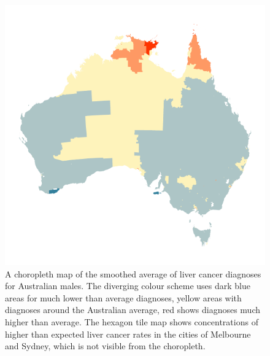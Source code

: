 \documentclass[conference,final,]{IEEEtran}
\begin{document}
\begin{figure}
\includegraphics[width=1\linewidth]{paper_files/figure-latex/liver-1} \caption{A choropleth map of the smoothed average of liver cancer diagnoses for Australian males. The diverging colour scheme uses dark blue areas for much lower than average diagnoses, yellow areas with diagnoses around the Australian average, red shows diagnoses much higher than average. The hexagon tile map shows concentrations of higher than expected liver cancer rates in the cities of Melbourne and Sydney, which is not visible from the choropleth.}\label{fig:liver}
\end{figure}
\end{document}
